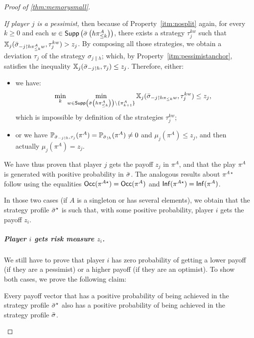 \begin{proof}[Proof of \cref{thm:memorysmall}]
\begin{claimproof}
\begin{claimproof}
   \emph{If player $j$ is a pessimist,} then because of Property~\ref{itm:nosplit} again, for every $k \geq 0$ and each $w \in \mathsf{Supp}\left({\bar{\sigma}}\left(h\pi^A_{\leq k}\right)\right)$, there exists a strategy $\tau_j^{kw}$ such that $\mathbb{X}_j({\bar{\sigma}}_{-j\upharpoonright h\pi^A_{\leq k}w}, \tau_j^{kw}) > z_j$.
        By composing all those strategies, we obtain a deviation $\tau_j$ of the strategy $\sigma_{j\|h}$; which, by Property~\ref{itm:pessimistanchor}, satisfies the inequality $\mathbb{X}_j({\bar{\sigma}}_{-j\upharpoonright h}, \tau_j) \leq z_j$.
        Therefore, either:
        \begin{itemize}
            \item we have:
            $$\min_k \min_{w \in \mathsf{Supp}\left({\bar{\sigma}}\left(h\pi^A_{\leq k}\right)\right) \setminus \{\pi^A_{k+1}\}} \mathbb{X}_j({\bar{\sigma}}_{-j\upharpoonright h\pi_{\leq k}w}, \tau^{kw}_j) \leq z_j,$$
            which is impossible by definition of the strategies $\tau_j^{kw}$;

            \item or we have $\mathbb{P}_{{\bar{\sigma}}_{-j\upharpoonright h}, \tau_j}(\pi^A) = \mathbb{P}_{{\bar{\sigma}}_{\upharpoonright h}}(\pi^A) \neq 0$ and $\mu_j(\pi^A) \leq z_j$, and then actually $\mu_j(\pi^A) = z_j$.
        \end{itemize}
        
         


We have thus proven that player $j$ gets the payoff $z_j$ in $\pi^A$, and that the play $\pi^A$ is generated with positive probability in ${\bar{\sigma}}$.
The analogous results about $\pi^{A\star}$ follow using the equalities $\mathsf{Occ}(\pi^{A\star}) = \mathsf{Occ}(\pi^A)$ and $\mathsf{Inf}(\pi^{A\star}) = \mathsf{Inf}(\pi^A)$.
\end{claimproof}

    In those two cases (if $A$ is a singleton or has several elements), we obtain that the strategy profile ${\bar{\sigma}}^\star$ is such that, with some positive probability, player $i$ gets the payoff $z_i$.


    \subparagraph*{Player $i$ gets risk measure $z_i$.}
    We still have to prove that player $i$ has zero probability of getting a lower payoff (if they are a pessimist) or a higher payoff (if they are an optimist).
    To show both cases, we prove the following claim:

    \begin{claim}
        Every payoff vector that has a positive probability of being achieved in the strategy profile ${\bar{\sigma}}^\star$ also has a positive probability of being achieved in the strategy profile ${\bar{\sigma}}$.
    \end{claim}


\end{claimproof}
\end{proof}
